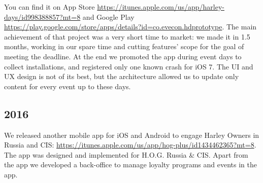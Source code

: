 You can find it on App Store
\href{https://itunes.apple.com/us/app/harley-days/id998388857?mt=8}{\url{https://itunes.apple.com/us/app/harley-days/id998388857?mt=8}}
and Google Play
\href{https://play.google.com/store/apps/details?id=co.evecon.hdprototype}{\url{https://play.google.com/store/apps/details?id=co.evecon.hdprototype}}.
The main achievement of that project was a very short time to market:
we made it in 1.5 months, working in our spare time and cutting
features' scope for the goal of meeting the deadline. At the end we
promoted the app during event days to collect installations, and
registered only one known crash for iOS 7. The UI and UX design is not
of its best, but the architecture allowed us to update only content
for every event up to these days.

\subsection*{2016}

We released another mobile app for iOS and Android to engage Harley
Owners in Russia and CIS:
\href{https://itunes.apple.com/us/app/hog-plus/id1434462365?mt=8}{\url{https://itunes.apple.com/us/app/hog-plus/id1434462365?mt=8}}.
The app was designed and implemented for H.O.G. Russia \& CIS. Apart
from the app we developed a back-office to manage loyalty programs and
events in the app.
